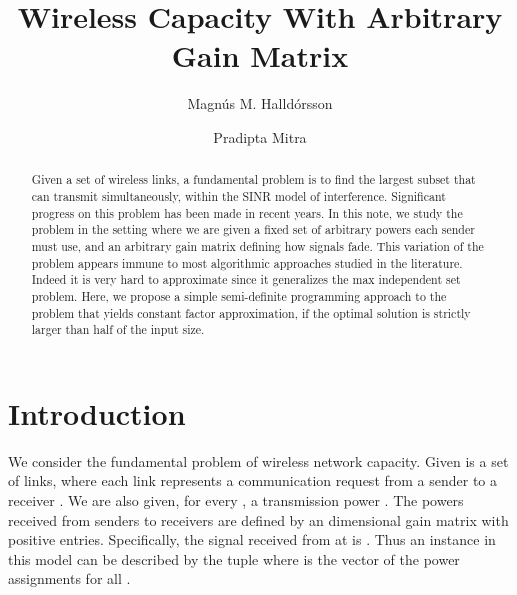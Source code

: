 \documentclass[11pt]{amsart}
\begin{document}
\title[Wireless Capacity With Arbitrary Gain Matrix]{Wireless Capacity With Arbitrary Gain Matrix}


\author[M. Halld\'orsson]{Magn\'us M. Halld\'orsson}
\address[M. Halld\'orsson]{School of Computer Science\\
Reykjavik University\\
Reykjavik 101, Iceland}

\author[P. Mitra]{Pradipta Mitra}
\address[P. Mitra]{School of Computer Science\\
Reykjavik University\\
Reykjavik 101, Iceland}



\begin{abstract}
Given a set of wireless links, a fundamental problem is to find the largest subset that can transmit simultaneously, within the SINR model of interference. Significant progress on this problem has been made in recent years. In this note, we study the problem in the setting where we are given a fixed set of arbitrary powers each sender must use, and an arbitrary gain matrix defining how signals fade. This variation of the problem
appears immune to most algorithmic approaches studied in the literature. Indeed it is very hard to approximate since 
it generalizes the max independent set problem.
Here, we propose a simple semi-definite programming approach to the problem that yields constant factor approximation, if the optimal solution is  strictly larger than half of the input size.
\end{abstract}

\maketitle

\section{Introduction}
We consider the fundamental problem of wireless network capacity.
Given is a set
 of links, where
each link  represents a communication request from a sender
 to a receiver .  We are also given,
for every , a transmission power . 
The powers received from senders to receivers are defined by an  dimensional gain matrix  with positive entries. Specifically, the signal received from  at  is . Thus an instance in this model
can be described by the tuple  where  is the vector of the power assignments  for all .
\end{document}
